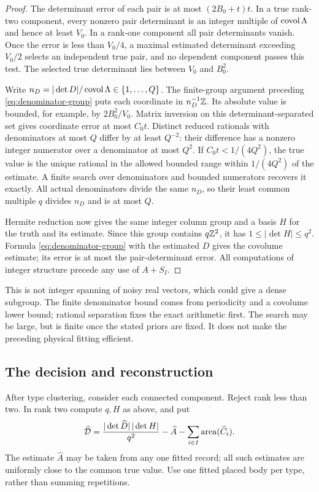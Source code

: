 \begin{proof}
The determinant error of each pair is at most $(2B_0+t)t$. In a true
rank-two component, every nonzero pair determinant is an integer multiple
of $\operatorname{covol}\Lambda$ and hence at least $V_0$. In a rank-one component
all pair determinants vanish. Once the error is less than $V_0/4$,
a maximal estimated determinant exceeding $V_0/2$ selects an independent
true pair, and no dependent component passes this test. The selected
true determinant lies between $V_0$ and $B_0^2$.

Write $n_D=|\det D|/\operatorname{covol}\Lambda\in\{1,\ldots,Q\}$. The
finite-group argument preceding \eqref{eq:denominator-group} puts each
coordinate in $n_D^{-1}\mathbb Z$. Its absolute value is bounded, for example,
by $2B_0^2/V_0$. Matrix inversion on this determinant-separated set
gives coordinate error at most $C_0t$. Distinct reduced rationals with
denominators at most $Q$ differ by at least $Q^{-2}$: their difference
has a nonzero integer numerator over a denominator at most $Q^2$.
If $C_0t<1/(4Q^2)$, the true value is the unique rational in the
allowed bounded range within $1/(4Q^2)$ of the estimate. A finite
search over denominators and bounded numerators recovers it exactly.
All actual denominators divide the same $n_D$, so their least common
multiple $q$ divides $n_D$ and is at most $Q$.

Hermite reduction now gives the same integer column group and a basis
$H$ for the truth and its estimate. Since this group contains
$q\mathbb Z^2$, it has $1\le|\det H|\le q^2$. Formula
\eqref{eq:denominator-group} with the estimated $D$ gives the covolume
estimate; its error is at most the pair-determinant error. All computations
of integer structure precede any use of $A+S_I$.
\end{proof}

This is not integer spanning of noisy real vectors, which could give
a dense subgroup. The finite denominator bound comes from periodicity
and a covolume lower bound; rational separation fixes the exact arithmetic
first. The search may be large, but is finite once the stated priors
are fixed. It does not make the preceding physical fitting efficient.

\subsection{The decision and reconstruction}
After type clustering, consider each connected component. Reject rank
less than two. In rank two compute $q,H$ as above, and put
\begin{equation}\label{eq:estimated-defect}
 \widehat{\mathcal D}
 =\frac{|\det\widehat D|\,|\det H|}{q^2}
           -\widehat A-\sum_{i\in I}\operatorname{area}(\widehat C_i).
\end{equation}
The estimate $\widehat A$ may be taken from any one fitted record;
all such estimates are uniformly close to the common true value. Use
one fitted placed body per type, rather than summing repetitions.


